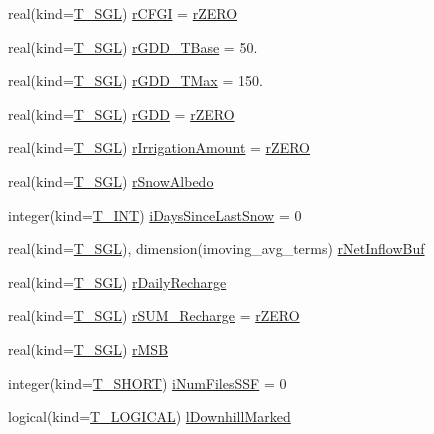 \begin{DoxyCompactItemize}
\item 
real(kind=\hyperlink{namespacetypes_af3012489af4c138f271f1bce244b7e51}{T\_\-SGL}) \hyperlink{typetypes_1_1_t___c_e_l_l_a6962c484fb07691a4b4d956b39e06b85}{rCFGI} = \hyperlink{namespacetypes_accfc31d1cd5f1a46b3fb99e6d1975a6b}{rZERO}
\item 
real(kind=\hyperlink{namespacetypes_af3012489af4c138f271f1bce244b7e51}{T\_\-SGL}) \hyperlink{typetypes_1_1_t___c_e_l_l_aa14e99827ceb68568f6606ee33094335}{rGDD\_\-TBase} = 50.
\item 
real(kind=\hyperlink{namespacetypes_af3012489af4c138f271f1bce244b7e51}{T\_\-SGL}) \hyperlink{typetypes_1_1_t___c_e_l_l_a810f77f0d2e171c26b1e9f236b30fe29}{rGDD\_\-TMax} = 150.
\item 
real(kind=\hyperlink{namespacetypes_af3012489af4c138f271f1bce244b7e51}{T\_\-SGL}) \hyperlink{typetypes_1_1_t___c_e_l_l_af9d73342889d5c096afc56647d441657}{rGDD} = \hyperlink{namespacetypes_accfc31d1cd5f1a46b3fb99e6d1975a6b}{rZERO}
\item 
real(kind=\hyperlink{namespacetypes_af3012489af4c138f271f1bce244b7e51}{T\_\-SGL}) \hyperlink{typetypes_1_1_t___c_e_l_l_a10aa0cef0074abddb47523b55bd1e179}{rIrrigationAmount} = \hyperlink{namespacetypes_accfc31d1cd5f1a46b3fb99e6d1975a6b}{rZERO}
\item 
real(kind=\hyperlink{namespacetypes_af3012489af4c138f271f1bce244b7e51}{T\_\-SGL}) \hyperlink{typetypes_1_1_t___c_e_l_l_a96a7ae897548ac05534c2d16a6f920f7}{rSnowAlbedo}
\item 
integer(kind=\hyperlink{namespacetypes_a4e4d040a4425196c4d43be63e7e6103a}{T\_\-INT}) \hyperlink{typetypes_1_1_t___c_e_l_l_afb9a7ef672ec4162d964751e513ff171}{iDaysSinceLastSnow} = 0
\item 
real(kind=\hyperlink{namespacetypes_af3012489af4c138f271f1bce244b7e51}{T\_\-SGL}), dimension(imoving\_\-avg\_\-terms) \hyperlink{typetypes_1_1_t___c_e_l_l_a6a0a052108e52ad56b2bf59e95d52a64}{rNetInflowBuf}
\item 
real(kind=\hyperlink{namespacetypes_af3012489af4c138f271f1bce244b7e51}{T\_\-SGL}) \hyperlink{typetypes_1_1_t___c_e_l_l_a9802fdd87665399c3dfd67aaf5a6ca05}{rDailyRecharge}
\item 
real(kind=\hyperlink{namespacetypes_af3012489af4c138f271f1bce244b7e51}{T\_\-SGL}) \hyperlink{typetypes_1_1_t___c_e_l_l_a56fead18ef4c2cb2b7a43eaf58c7ac36}{rSUM\_\-Recharge} = \hyperlink{namespacetypes_accfc31d1cd5f1a46b3fb99e6d1975a6b}{rZERO}
\item 
real(kind=\hyperlink{namespacetypes_af3012489af4c138f271f1bce244b7e51}{T\_\-SGL}) \hyperlink{typetypes_1_1_t___c_e_l_l_ab4d4f9e552cd62069b44ee3d08f90979}{rMSB}
\item 
integer(kind=\hyperlink{namespacetypes_af6b9654915a854564cb3f5ded061addc}{T\_\-SHORT}) \hyperlink{typetypes_1_1_t___c_e_l_l_aa9513e137590e4957c50db0d70947804}{iNumFilesSSF} = 0
\item 
logical(kind=\hyperlink{namespacetypes_adfa8f4f6096bb7bdbb93f36b911dcaad}{T\_\-LOGICAL}) \hyperlink{typetypes_1_1_t___c_e_l_l_aff95e831b6e34dbd3063ed1ef0acbf20}{lDownhillMarked}
\end{DoxyCompactItemize}


